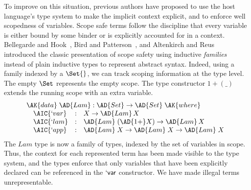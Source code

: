 To improve on this situation, previous authors have proposed to use
the host language's type system to make the implicit context explicit,
and to enforce well scopedness of variables. Scope safe terms follow
the discipline that every variable is either bound by some binder or
is explicitly accounted for in a context. Bellegarde and
Hook~\citeyear{BELLEGARDE1994287}, Bird and
Patterson~\citeyear{bird_paterson_1999}, and Altenkirch and
Reus~\citeyear{altenkirch1999monadic} introduced the classic
presentation of scope safety using inductive
\emph{families}~\cite{dybjer1994inductive} instead of plain inductive
types to represent abstract syntax. Indeed, using a family indexed by
a $\Set{}$, we can track scoping information at the type level. The
empty $\Set$ represents the empty scope. The type constructor
$1 + (\_)$ extends the running scope with an extra variable.
\begin{displaymath}
  \begin{array}{l}
    \AK{data}\;\AD{Lam} : \AD{Set} \to \AD{Set}\;\AK{where} \\
    \quad\begin{array}{@{}lll}
           \AIC{`var} &:& X \to \AD{Lam}\,X \\
           \AIC{`lam} &:& \AD{Lam}\;(\AD{1+} X) \to \AD{Lam}\,X \\
           \AIC{`app} &:& \AD{Lam}\;X \to \AD{Lam}\;X \to \AD{Lam}\;X
    \end{array}
  \end{array}
\end{displaymath}
The $\mathit{Lam}$ type is now a family of types, indexed by the set
of variables in scope. Thus, the context for each represented term has
been made visible to the type system, and the types enforce that only
variables that have been explicitly declared can be referenced in the
$\mathsf{`var}$ constructor. We have made illegal terms
unrepresentable.


